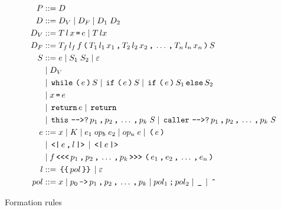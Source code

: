 \begin{table}[h!]
  \begin{align*}
    P         & ::= D \\
    D         & ::= D_V \gp D_F \gp D_1 \; D_2 \\
    D_V       & ::= T \, l \, x \tk = e \gp T \, l x \\
    D_F       & ::= T_f \, l_f \, f \tk ( T_1 \, l_1 \, x_1 \tk , T_2 \, l_2 \, x_2 \tk , \dots \tk , T_n \, l_n \, x_n \tk ) S \\
    S         & ::= e \gp S_1 \; S_2 \gp \varepsilon \\
              & \gp D_V \\
              & \gp \tk{while} \tk ( e \tk ) S \gp \tk{if} \tk ( e \tk ) S \gp \tk{if} \tk ( e \tk ) S_1 \tk{else} S_2 \\
              & \gp x \tk = e \\
              & \gp \tk{return} e \gp \tk{return} \\
              & \gp \tk{this} \tk{-{}->?} p_1 \tk , p_2 \tk , \dots \tk , p_k \; S \gp \tk{caller} \tk{-{}->?} p_1 \tk , p_2 \tk , \dots \tk , p_k \; S \\
    e         & ::= x \gp K \gp e_1 \; op_b \; e_2 \gp op_u \; e \gp \tk ( e \tk ) \\
              & \gp \tk{<|} e \tk , l \tk{|>} \gp \tk{<|} e \tk{|>} \\
              & \gp f \tk{<{}<{}<} p_1 \tk , p_2 \tk , \dots \tk , p_k \tk{>{}>{}>} \tk ( e_1 \tk , e_2 \tk , \dots \tk , e_n \tk ) \\
    l         & ::= \tk{\{\{} pol \tk{\}\}} \gp \varepsilon \\
    pol       & ::= x \gp p_0 \tk{->} p_1 \tk , p_2 \tk , \dots \tk , p_k \gp pol_1 \tk ; pol_2 \gp \tk \_ \gp \tk{\^{}}
  \end{align*}
  \caption{Formation rules}
  \label{ctif:rules}
\end{table}
